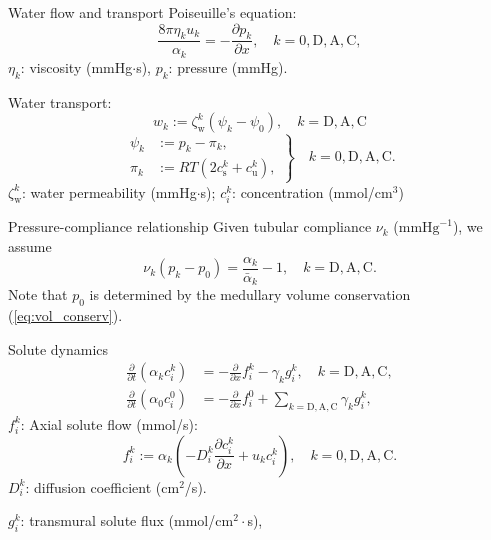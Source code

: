 \documentclass{beamer}
\begin{document}
\begin{frame}{Water flow and transport}
    Poiseuille's equation:
    \begin{equation}
        \frac{8\pi\eta_k u_k}{\alpha_k} = -\frac{\partial p_k}{\partial x},\quad k=0,\mathrm{D},\mathrm{A},\mathrm{C},
    \end{equation}
    $\eta_k$: viscosity (mmHg$\cdot$s), $p_k$: pressure (mmHg).
    \pause

    Water transport:
    \begin{equation}
        w_k := \zeta_\mathrm{w}^k\left( \psi_k - \psi_0 \right),\quad  k=\mathrm{D},\mathrm{A},\mathrm{C}
    \end{equation}
    \begin{equation}
        \left. \begin{aligned}
            \psi_k&:=p_k - \pi_k,\\
            \pi_k&:= RT\left( 2c_\mathrm{s}^k+c_\mathrm{u}^k\right),
        \end{aligned} \right\}
        \quad k=0,\mathrm{D},\mathrm{A},\mathrm{C}.
    \end{equation}
    $\zeta_\mathrm{w}^k$: water permeability (mmHg$\cdot$s); $c_i^k$: concentration (mmol/$\text{cm}^3$)
\end{frame}

\begin{frame}{Pressure-compliance relationship}
    Given tubular compliance $\nu_k$ ($\text{mmHg}^{-1}$), we assume
    \begin{equation}
        \nu_k(p_k - p_0) = \frac{\alpha_k}{\bar{\alpha}_k} - 1,\quad k=\mathrm{D},\mathrm{A},\mathrm{C}.
    \end{equation}
    Note that $p_0$ is determined by the medullary volume conservation (\ref{eq:vol_conserv}).
\end{frame}

\begin{frame}{Solute dynamics}
    \begin{align}\label{eq:solute_dynamics}
        \frac{\partial}{\partial t}\left( \alpha_k c_i^k \right)&=-\frac{\partial}{\partial x} f_i^k - \gamma_kg_i^k,\quad k=\mathrm{D},\mathrm{A},\mathrm{C},\\
        \frac{\partial}{\partial t}\left( \alpha_0 c_i^0 \right)&=-\frac{\partial}{\partial x} f_i^0 + \sum_{k=\mathrm{D},\mathrm{A},\mathrm{C}} \gamma_k g_i^k,
    \end{align}
    $f_i^k$: Axial solute flow (mmol/s):
    \begin{equation}
        f_i^k := \alpha_k\left( -D_i^k\frac{\partial c_i^k}{\partial x}+u_kc_i^k \right),\quad k=0,\mathrm{D},\mathrm{A},\mathrm{C}.
    \end{equation}
    $D_i^k$: diffusion coefficient ($\text{cm}^2$/s).

    $g_i^k$: transmural solute flux (mmol/$\text{cm}^2\cdot$s),
\end{frame}
\end{document}
